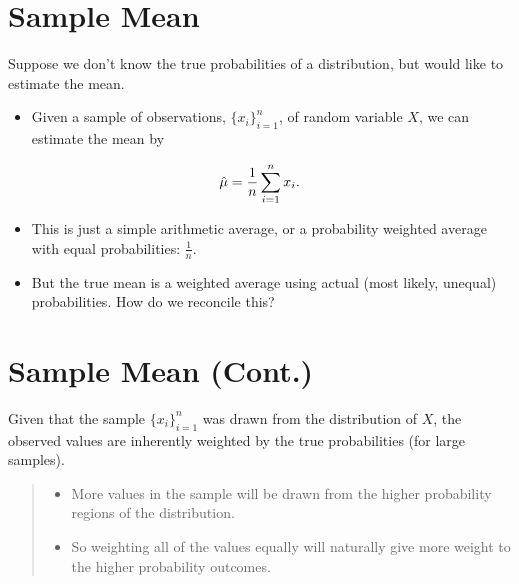 \documentclass[letterpaper,10pt,english]{sphinxmanual}
\begin{document}
\section{Sample Mean}
\label{probability:sample-mean}
Suppose we don't know the true probabilities of a distribution, but
would like to estimate the mean.
\begin{itemize}
\item {} 
Given a sample of observations, $\{x_i\}_{i=1}^n$, of random
variable $X$, we can estimate the mean by

\end{itemize}
\begin{gather}
\begin{split}\hat{\mu} = \frac{1}{n} \sum_{i=1}^n x_i.\end{split}\notag
\end{gather}\begin{itemize}
\item {} 
This is just a simple arithmetic average, or a probability
weighted average with equal probabilities: $\frac{1}{n}$.

\end{itemize}
\begin{itemize}
\item {} 
But the true mean is a weighted average using actual (most likely,
unequal) probabilities. How do we reconcile this?

\end{itemize}


\section{Sample Mean (Cont.)}
\label{probability:sample-mean-cont}
Given that the sample $\{x_i\}_{i=1}^n$ was drawn from the
distribution of $X$, the observed values are inherently weighted by
the true probabilities (for large samples).
\begin{quote}
\begin{itemize}
\item {} 
More values in the sample will be drawn from the higher probability
regions of the distribution.

\end{itemize}
\begin{itemize}
\item {} 
So weighting all of the values equally will naturally give more
weight to the higher probability outcomes.

\end{itemize}
\end{quote}
\end{document}

